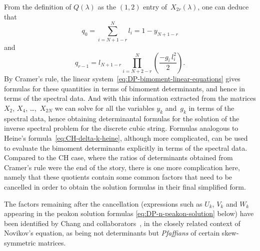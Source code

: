 \documentclass[10pt,a4paper]{article} \pdfoutput=1 
\begin{document}
From the definition of $Q(\lambda)$ as the $(1,2)$ entry of~$X_{2r}(\lambda)$,
one can deduce that
\begin{equation*}
  q_0 = \sum_{i=N+1-r}^N \!\!\!\! l_i = 1 - y_{N+1-r}
\end{equation*}
and
\begin{equation*}
  q_{r-1} = l_{N+1-r} \prod_{i=N+2-r}^N \left( \frac{-g_i \, l_i^2}{2} \right)
  .
\end{equation*}
By Cramer's rule,
the linear system~\eqref{eq:DP-bimoment-linear-equations} gives
formulas for these quantities in terms of bimoment determinants,
and hence in terms of the spectral data.
And with this information extracted from the matrices $X_2$, $X_4$, \ldots,~$X_{2N}$
we can solve for all the variables $y_k$ and~$g_k$
in terms of the spectral data,
hence obtaining determinantal formulas for the solution of
the inverse spectral problem for the discrete cubic string.
Formulas analogous to Heine's formula~\eqref{eq:CH-delta-k-heine},
although more complicated, can be used to evaluate the bimoment determinants
explicitly in terms of the spectral data.
Compared to the CH case, where the ratios of determinants obtained from Cramer's rule
were the end of the story, there is one more complication here,
namely that these quotients contain some common factors that need to be cancelled
in order to obtain the solution formulas in their final simplified form.

\begin{remark}
  The factors remaining after the cancellation (expressions such as $U_k$, $V_k$ and $W_k$ appearing
  in the peakon solution formulas \eqref{eq:DP-n-peakon-solution} below)
  have been identified by Chang and
  collaborators~\cite{chang-hu-li-zhao:2018:novikov-peakons-pfaffians-Toda-lattice-BKP,
    chang:2022:hermite-pade-pfaffian-structures-novikov-and-integrable-lattices},
  in the closely related context of Novikov's equation,
  as being not determinants but \emph{Pfaffians} of certain skew-symmetric matrices.
\end{remark}
\end{document}
